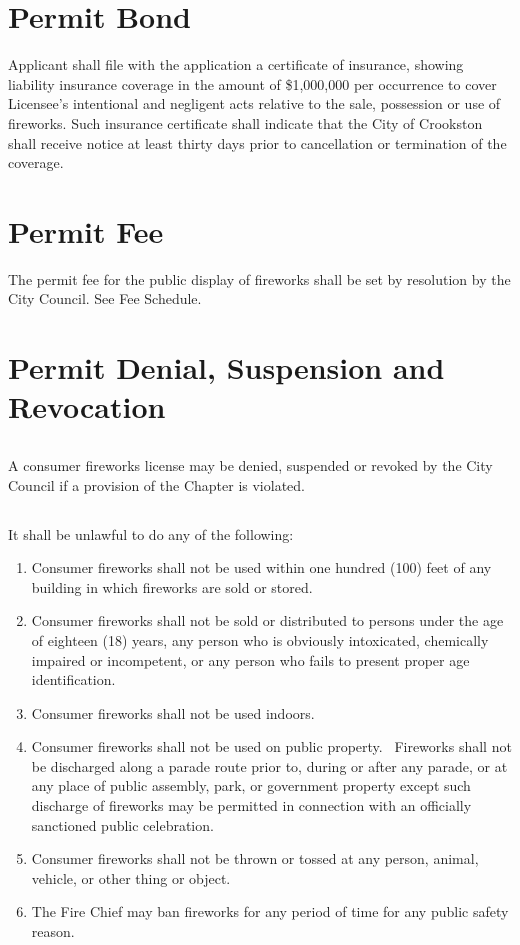 \section{Permit Bond}
Applicant shall file with the application a certificate of insurance, showing liability insurance coverage in the amount of \$1,000,000 per occurrence to cover Licensee's intentional and negligent acts relative to the sale, possession or use of fireworks. Such insurance certificate shall indicate that the City of Crookston shall receive notice at least thirty days prior to cancellation or termination of the coverage.

\section{Permit Fee}
The permit fee for the public display of fireworks shall be set by resolution by the City Council. See Fee Schedule.

\section{Permit Denial, Suspension and Revocation}
\subsection{}
A consumer fireworks license may be denied, suspended or revoked by the City Council if a provision of the Chapter is violated.
\subsection{}
It shall be unlawful to do any of the following:
\begin{enumerate}[{\indent}1)]
    \item Consumer fireworks shall not be used within one hundred (100) feet of any building in which fireworks are sold or stored.
    \item Consumer fireworks shall not be sold or distributed to persons under the age of eighteen (18) years, any person who is obviously intoxicated, chemically impaired or incompetent, or any person who fails to present proper age identification.
    \item Consumer fireworks shall not be used indoors.
    \item Consumer fireworks shall not be used on public property.  Fireworks shall not be discharged along a parade route prior to, during or after any parade, or at any place of public assembly, park, or government property except such discharge of fireworks may be permitted in connection with an officially sanctioned public celebration.
    \item Consumer fireworks shall not be thrown or tossed at any person, animal, vehicle, or other thing or object.
    \item The Fire Chief may ban fireworks for any period of time for any public safety reason.
\end{enumerate}

